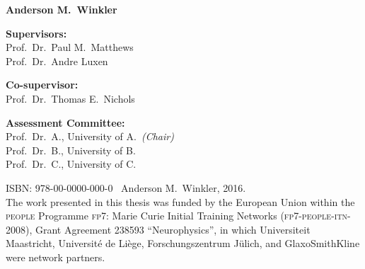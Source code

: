 \begin{center}
\begin{Large}
\textbf{Anderson M.\ Winkler}
\end{Large}
\end{center}

\vspace*{3cm}
\vspace*{\fill}

\newpage
{}
\noindent
\textbf{Supervisors:}\\
Prof.\ Dr.\ Paul M.\ Matthews\\
Prof.\ Dr.\ Andre Luxen

\vspace*{5mm}

\noindent
\textbf{Co-supervisor:}\\
Prof.\ Dr.\ Thomas E.\ Nichols\\

\vspace*{5mm}

\noindent
\textbf{Assessment Committee:}\\
Prof.\ Dr.\ A., University of A.\ \emph{(Chair)}\\
Prof.\ Dr.\ B., University of B.\\
Prof.\ Dr.\ C., University of C.

\vfill

\noindent
ISBN: 978-00-0000-000-0 \textcopyright\ Anderson M.\ Winkler, 2016.\\
The work presented in this thesis was funded by the European Union within the \textsc{people} Programme \textsc{fp7}: Marie Curie Initial Training Networks (\textsc{fp7-people-itn-2008}), Grant Agreement 238593 ``Neurophysics'', in which Universiteit Maas\-tricht, Universit\'{e} de Li\`{e}ge, Forschungszentrum J\"{u}lich, and GlaxoSmithKline were network partners.

